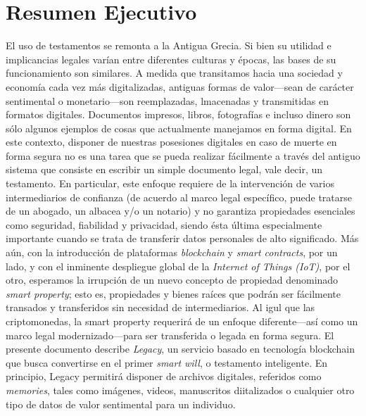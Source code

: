 
\chapter{Resumen Ejecutivo} %
\label{cha:executive_summary}

El uso de testamentos se remonta a la Antigua Grecia. Si bien su utilidad e implicancias legales varían entre diferentes culturas y épocas, las bases de su funcionamiento son similares.
A medida que transitamos hacia una sociedad y economía cada vez más digitalizadas, antiguas formas de valor---sean de carácter sentimental o monetario---son reemplazadas, lmacenadas y transmitidas en formatos digitales. Documentos impresos, libros, fotografías e incluso dinero son sólo algunos ejemplos de cosas que actualmente manejamos en forma digital.
En este contexto, disponer de nuestras posesiones digitales en caso de muerte en forma segura no es una tarea que se pueda realizar fácilmente a través del antiguo sistema que consiste en escribir un simple documento legal, vale decir, un testamento.
En particular, este enfoque requiere de la intervención de varios intermediarios de confianza (de acuerdo al marco legal específico, puede tratarse de un abogado, un albacea y/o un notario) y no garantiza propiedades esenciales como seguridad, fiabilidad y privacidad, siendo ésta última especialmente importante cuando se trata de transferir datos personales de alto significado.
Más aún, con la introducción de plataformas \textit{blockchain} y \textit{smart contracts}, por un lado, y con el inminente despliegue global de la \textit{Internet of Things (IoT)}, por el otro, esperamos la irrupción de un nuevo concepto de propiedad denominado \textit{smart property}; esto es, propiedades y bienes raíces que podrán ser fácilmente transados y transferidos sin necesidad de intermediarios. Al igul que las criptomonedas, la smart property requerirá de un enfoque diferente---así como un marco legal modernizado---para ser transferida o legada en forma segura.
El presente documento describe \textit{Legacy}, un servicio basado en tecnología blockchain que busca convertirse en el primer \textit{smart will}, o testamento inteligente. En principio, Legacy permitirá disponer de archivos digitales, referidos como \textit{memories}, tales como imágenes, videos, manuscritos diitalizados o cualquier otro tipo de datos de valor sentimental para un individuo. 
